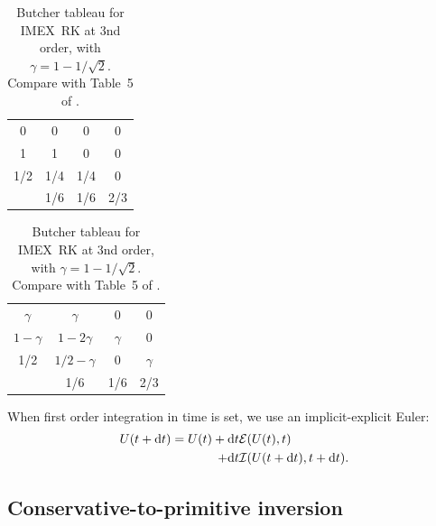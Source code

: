 \documentclass[aps,prd,twocolumn,a4paper,floatfix,nofootbib,superscriptaddress,nofootinbib]{revtex4}
\begin{document}
%
\begin{table}
\caption{Butcher tableau for IMEX~RK at 3nd order,
with $\gamma= 1 - 1/\sqrt 2$. Compare with Table~5 of \citet{Pareschi10}.}
\begin{tabular}{c|ccc}
0 & 0 & 0 & 0 \\
1 & 1 & 0 & 0 \\
1/2 & 1/4 & 1/4 & 0 \\
\hline
& 1/6 & 1/6 & 2/3
\end{tabular}
\hspace{1cm}
\begin{tabular}{c|ccc}
$\gamma$ & $\gamma$ & 0 & 0 \\
$1-\gamma$ & $1-2\gamma$ & $\gamma$ & 0\\
1/2 & $1/2-\gamma$ & 0 & $\gamma$ \\
\hline
& 1/6 & 1/6 & 2/3
\end{tabular}
\label{tab:3rd}
\end{table}
%
When first order integration in time is set, we use an implicit-explicit Euler:
\begin{align}
U(t+\mathrm dt)= U(t) +{}& \mathrm dt \mathcal E(U(t),t)\notag\\
+{}& \mathrm dt \mathcal I(U(t+\mathrm dt),t+\mathrm dt).
\end{align}

\subsection{Conservative-to-primitive inversion}
\label{ssec:c2p}
\end{document}
